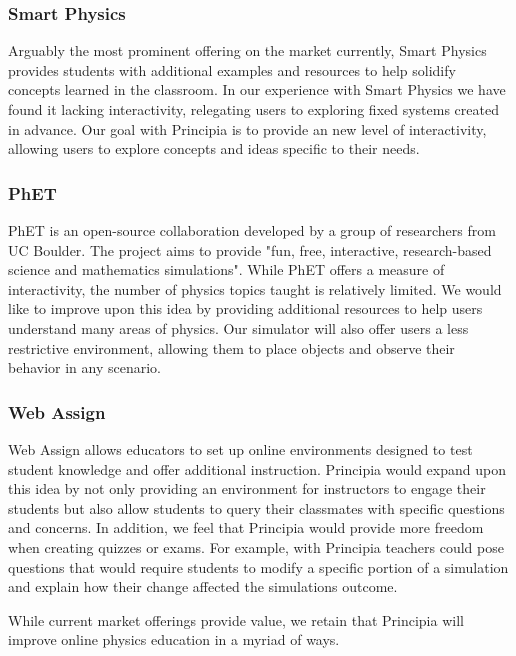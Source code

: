 \subsubsection{Smart Physics}

Arguably the most prominent offering on the market currently,  Smart Physics provides students with additional examples and resources to help solidify concepts learned in the classroom.  In our experience with Smart Physics we have found it lacking interactivity, relegating users to exploring fixed systems created in advance.  Our goal with Principia is to provide an new level of interactivity, allowing users to explore concepts and ideas specific to their needs.

\subsubsection{PhET}

PhET is an open-source collaboration developed by a group of researchers from UC Boulder.  The project aims to provide "fun, free, interactive, research-based science and mathematics simulations".  While PhET offers a measure of interactivity, the number of physics topics taught is relatively limited.  We would like to improve upon this idea by providing additional resources to help users understand many areas of physics. Our simulator will also offer users a less restrictive environment, allowing them to place objects and observe their behavior in any scenario.

\subsubsection{Web Assign}

Web Assign allows educators to set up online environments designed to test student knowledge and offer additional instruction.  Principia would expand upon this idea by not only providing an environment for instructors to engage their students but also allow students to query their classmates with specific questions and concerns.  In addition, we feel that Principia would provide more freedom when creating quizzes or exams.  For example, with Principia teachers could pose questions that would require students to modify a specific portion of a simulation and explain how their change affected the simulations outcome.  

While current market offerings provide value, we retain that Principia will improve online physics education in a myriad of ways.


